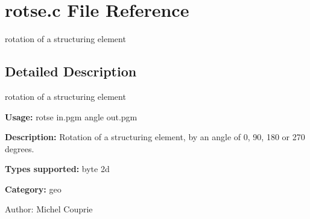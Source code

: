 \section{rotse.c File Reference}
\label{rotse_8c}
rotation of a structuring element 



\subsection{Detailed Description}
rotation of a structuring element 

{\bf Usage:} rotse in.pgm angle out.pgm

{\bf Description:} Rotation of a structuring element, by an angle of 0, 90, 180 or 270 degrees.

{\bf Types supported:} byte 2d

{\bf Category:} geo

\begin{Desc}
\item[Author:]Michel Couprie \end{Desc}
